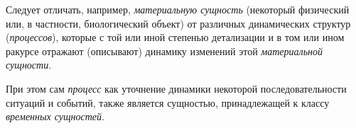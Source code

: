 Следует отличать, например, \textit{материальную сущность} (некоторый физический или, в частности, биологический объект) от различных динамических структур (\textit{процессов}), которые с той или иной степенью детализации и в том или ином ракурсе отражают (описывают) динамику изменений этой \textit{материальной сущности}. 
			
При этом сам \textit{процесс} как уточнение динамики некоторой последовательности ситуаций и событий, также является сущностью, принадлежащей к классу \textit{временных сущностей}.

\begin{comment}
	

\begin{SCn}
\scnheader{прошлая сущность}
\scnidtf{сущность, существовавшая в прошлом времени}
\scnidtf{сущность прошлого времени}
\scnidtf{сущность, завершившая свое существование}

\bigskip
\bigskip
\scnheader{настоящая сущность}
\scnidtf{сущность, существующая в текущий момент времени}
\scnidtf{сущность, существующая сейчас}
\scnidtf{сущность настоящего времени}
		
\scnheader{будущая сущность}
\scnidtf{возможно будущая сущность}
\scnidtf{прогнозируемая временная сущность}
\scnidtf{временная сущность, которая может существовать в будущем}
\scnidtf{сущность, которая может или должна начать свое существование в будущем времени}
\scnrelfrom{включение}{инициированное действие}
\end{SCn}

Каждой \textbf{\textit{будущей сущности}} можно поставить в соответствие вероятность ее возникновения.
	
\begin{SCn}
\scnheader{временная связь}
\scnidtf{нестационарная связь}
\scnidtf{временно существующая связь}
\end{SCn}

Каждая \textbf{\textit{временная связь}} представляет собой \textit{связку}, принадлежащую множеству \textit{временных сущностей}.
			
Понятие \textbf{\textit{временной связи}} не следует путать с понятием \textit{темпоральной связи}, которая сама является \textit{постоянной сущностью}, описывающей то, как связаны во времени некоторые \textit{временные сущности}.

\begin{SCn}
\scnheader{ситуация}
\scnidtf{состояние}
\scnidtf{временная структура}
\scnidtf{временно существующая структура}
\scnidtf{квазистационарная структура}
\scnidtf{состояние некоторой динамической системы, описываемое с некоторой степенью детализации (подробности)}
\scnidtf{квазистационарная структура, существующая временно (в течение некоторого отрезка времени)}
\end{SCn}


\end{comment}
